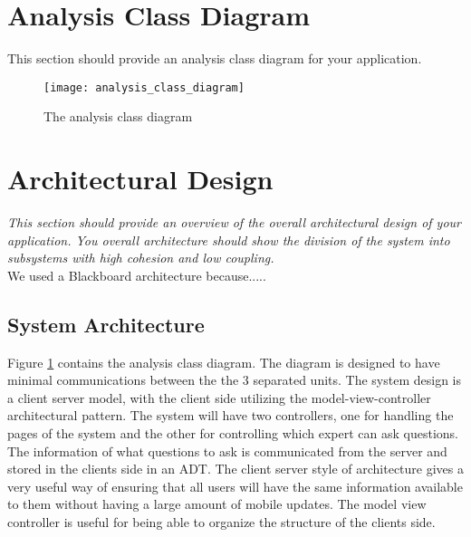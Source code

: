\documentclass[titlepage]{article}
\begin{document}
\section{Analysis Class Diagram}
\label{sec:analysis_class_diagram}
This section should provide an analysis class diagram for your application.

\label{sub:system_architecture}
	\begin{center}
		\begin{figure}[H]
			\texttt{[image: analysis\_class\_diagram]}
			\caption{The analysis class diagram}\label{diagram:analysisclass}
		\end{figure}
	\end{center}
	


\section{Architectural Design}
\label{sec:architectural_design}
\textit{This section should provide an overview of the overall architectural design of your application. You overall architecture should show the division of the system into subsystems with high cohesion and low coupling.}\\
We used a Blackboard architecture because.....




\subsection{System Architecture}

Figure \ref{diagram:analysisclass} contains the analysis class diagram. The diagram is designed to have minimal communications between the the 3 separated units. The system design is a client server model, with the client side utilizing the model-view-controller architectural pattern. The system will have two controllers, one for handling the pages of the system and the other for controlling which expert can ask questions. The information of what questions to ask is communicated from the server and stored in the clients side in an ADT. The client server style of architecture gives a very useful way of ensuring that all users will have the same information available to them without having a large amount of mobile updates. The model view controller is useful for being able to organize the structure of the clients side.
\end{document}
